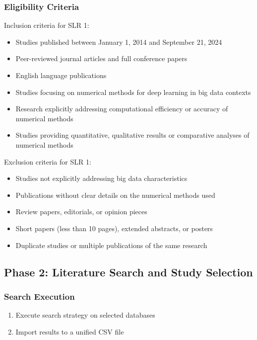 \documentclass[a4paper,12pt]{article}
\begin{document}
\subsubsection{Eligibility Criteria}
Inclusion criteria for SLR 1:
\begin{itemize}
    \item Studies published between January 1, 2014 and September 21, 2024
    \item Peer-reviewed journal articles and full conference papers
    \item English language publications
    \item Studies focusing on numerical methods for deep learning in big data contexts
    \item Research explicitly addressing computational efficiency or accuracy of numerical methods
    \item Studies providing quantitative, qualitative results or comparative analyses of numerical methods
\end{itemize}

Exclusion criteria for SLR 1:
\begin{itemize}
    \item Studies not explicitly addressing big data characteristics
    \item Publications without clear details on the numerical methods used
    \item Review papers, editorials, or opinion pieces
    \item Short papers (less than 10 pages), extended abstracts, or posters
    \item Duplicate studies or multiple publications of the same research
\end{itemize}
\subsection{Phase 2: Literature Search and Study Selection}

\subsubsection{Search Execution}

\begin{enumerate}
    \item Execute search strategy on selected databases
    \item Import results to a unified CSV file
\end{enumerate}
\end{document}
